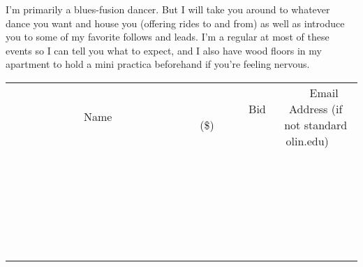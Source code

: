\documentclass[11pt]{article}
\begin{document}
I'm primarily a blues-fusion dancer. But I will take you around to whatever dance you want and house you (offering rides to and from) as well as introduce you to some of my favorite follows and leads.
I'm a regular at most of these events so I can tell you what to expect, and I also have wood floors in my apartment to hold a mini practica beforehand if you're feeling nervous.
\\[6ex]
\begin{tabular}{c c c}
~~~~~~~~~~~~~Name~~~~~~~~~~~~~ & ~~~~~~~~~Bid (\$)~~~~~~~~~  & ~~~Email Address (if not standard olin.edu)~~~\\
 & & \\
\hline
 & & \\
\hline
 & & \\
\hline
 & & \\
\hline
 & & \\
\hline
 & & \\
\hline
 & & \\
\hline
 & & \\
\hline
 & & \\
\hline
 & & \\
\hline
 & & \\
\hline
 & & \\
\hline
 & & \\
\hline
 & & \\
\hline
 & & \\
\hline
 & & \\
\hline
 & & \\
\hline
 & & \\
\hline
 & & \\
\hline
 & & \\
\hline
 & & \\
\hline
 & & \\
\hline
 & & \\
\hline
 & & \\
\hline
 & & \\
\hline
 & & \\
\hline
\end{tabular}
\newpage
\end{document}
